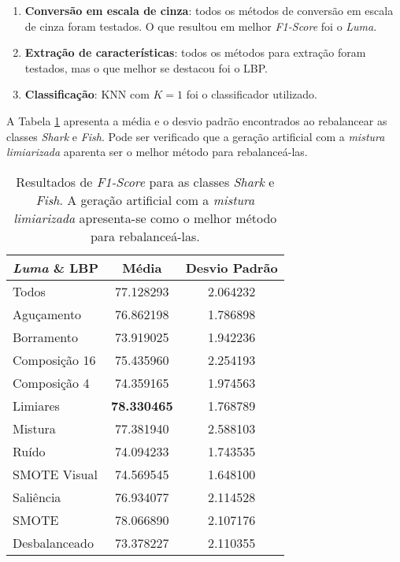 \begin{enumerate}
\item \textbf{Conversão em escala de cinza}: todos os métodos de conversão em escala de cinza foram testados. O que resultou em melhor \textit{F1-Score} foi o \emph{Luma}.

\item \textbf{Extração de características}: todos os métodos para extração foram testados, mas o que melhor se destacou foi o LBP.
\item \textbf{Classificação}: KNN com $K = 1$ foi o classificador utilizado.

\end{enumerate}

A Tabela \ref{tab:resultados:shark} apresenta a média e o desvio padrão encontrados ao rebalancear as classes \textit{Shark} e \textit{Fish}. Pode ser verificado que a geração artificial com a \emph{mistura limiarizada} aparenta ser o melhor método para rebalanceá-las.

\begin{table}[!htbp]
\begin{center}
\caption{Resultados de \textit{F1-Score} para as classes \textit{Shark} e \textit{Fish}. A geração artificial com a \emph{mistura limiarizada} apresenta-se como o melhor método para rebalanceá-las.}
\label{tab:resultados:shark}
\begin{tabular}{|l|c|c|}
\hline
\textbf{\emph{Luma} \& LBP} & \textbf{Média}     & \textbf{Desvio Padrão} \\ \hline
   Todos        &  77.128293 &  2.064232  \\ \hline
  Aguçamento    &  76.862198 &  1.786898  \\ \hline
  Borramento    &  73.919025 &  1.942236  \\ \hline
  Composição 16 &  75.435960 &  2.254193  \\ \hline
  Composição 4  &  74.359165 &  1.974563  \\ \hline
  Limiares      &  \textbf{78.330465} &  1.768789  \\ \hline
  Mistura       &  77.381940 &  2.588103  \\ \hline
  Ruído         &  74.094233 &  1.743535  \\ \hline
  SMOTE Visual  &  74.569545 &  1.648100  \\ \hline
  Saliência     &  76.934077 &  2.114528  \\ \hline
 SMOTE          &  78.066890 &  2.107176  \\ \hline
Desbalanceado   &  73.378227 &  2.110355  \\ \hline
\end{tabular}
\end{center}
\end{table}

